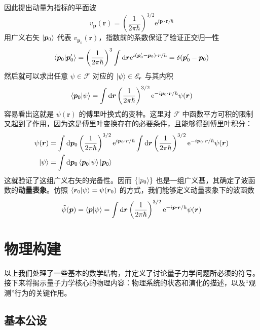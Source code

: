 \documentclass[cn,10pt,math=newtx,citestyle=gb7714-2015,bibstyle=gb7714-2015]{elegantbook}
\def\bm{\boldsymbol}
\def\bf{\textbf}
\def\ms{\mathscr}
\def\mc{\mathcal}
\def\d{\mathrm d}
\def\e{\mathrm e}
\def\td{\tilde}
\begin{document}
因此提出动量为指标的平面波
\begin{equation}
   \label{eq:planewave}
   v_{\bm p}(\bm r)=\left(\frac{1}{2\pi\hbar}\right)^{3/2}\e^{i\bm p\cdot\bm r/\hbar}
\end{equation}
用广义右矢 $\ket{\bm p_0}$ 代表 $v_{\bm p_0}(\bm r)$，指数前的系数保证了验证正交归一性
\begin{equation}
   \braket{\bm p_0|\bm p_0'}=\left(\frac{1}{2\pi\hbar}\right)^3\int\d\bm r\e^{i(\bm p_0'-\bm p_0)\cdot\bm r/\hbar}=\delta(\bm p_0'-\bm p_0)
\end{equation}
然后就可以求出任意 $\psi\in\mc F$ 对应的 $\ket{\psi}\in\ms E_{\bm r}$ 与其内积
\begin{equation}
   \braket{\bm p_0|\psi}=\int\d\bm r\left(\frac{1}{2\pi\hbar}\right)^{3/2}\e^{-i\bm p_0\cdot\bm r/\hbar}\psi(\bm r)
\end{equation}
容易看出这就是 $\psi(\bm r)$ 的傅里叶换式的变种。这里对 $\mc F$ 中函数平方可积的限制又起到了作用，因为这是傅里叶变换存在的必要条件，且能够得到傅里叶积分：
\begin{align}
   \label{eq:fourierintegral}
   \psi(\bm r) & =\int\d\bm p_0\left(\frac{1}{2\pi\hbar}\right)^{3/2}\e^{i\bm p_0\cdot\bm r/\hbar}\int\d\bm r\left(\frac{1}{2\pi\hbar}\right)^{3/2}\e^{-i\bm p_0\cdot\bm r/\hbar}\psi(\bm r)\\
   \ket{\psi} & =\int\d\bm p_0\braket{\bm p_0|\psi}\ket{\bm p_0}
\end{align}
这就验证了这组广义右矢的完备性。因而 $\{\ket{p_0}\}$ 也是一组广义基，其确定了波函数的\bf{动量表象}。仿照 $\braket{\bm r_0|\psi}=\psi(\bm r_0)$ 的方式，我们能够定义动量表象下的波函数
\begin{equation}
   \label{eq:wavefuncp}
   \td{\psi}(\bm p)=\braket{\bm p|\psi}=\int\d\bm r\left(\frac{1}{2\pi\hbar}\right)^{3/2}\e^{-i\bm p\cdot\bm r/\hbar}\psi(\bm r)
\end{equation}

\section{物理构建}

以上我们处理了一些基本的数学结构，并定义了讨论量子力学问题所必须的符号。接下来将揭示量子力学核心的物理内容：物理系统的状态和演化的描述，以及“观测”行为的关键作用。

\subsection{基本公设}
\end{document}
